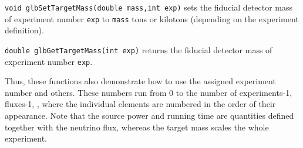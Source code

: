 \begin{function}
{\tt void glbSetTargetMass(double mass,int exp)}
sets the fiducial detector mass of experiment number {\tt exp} to {\tt mass} tons or kilotons (depending on the experiment definition).
\end{function}
\begin{function}
{\tt double glbGetTargetMass(int exp)}
returns the fiducial detector mass of experiment number {\tt exp}.
\end{function}
Thus, these functions also demonstrate how to use the assigned experiment number and others. These numbers run from $0$ to the number of experiments-1, fluxes-1, \etc, where the individual elements are numbered in the order of their appearance. 
 Note that the source power and running time are quantities defined
together with the neutrino flux, whereas the target mass scales the whole
experiment.

